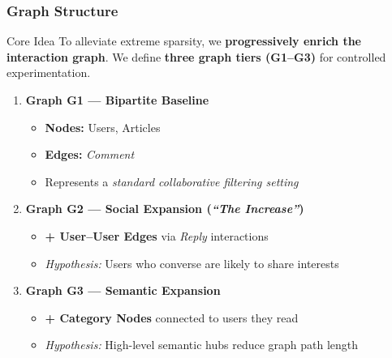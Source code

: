 \documentclass{beamer}
\begin{document}
\begin{frame}
    \frametitle {Graph Structure}

    \begin{block}{Core Idea}
        To alleviate extreme sparsity, we \textbf{progressively enrich the interaction graph}.
        We define \textbf{three graph tiers (G1–G3)} for controlled experimentation.
    \end{block}

    \vspace{0.3cm}

    \begin{enumerate}
        \setlength\itemsep{0.9em}

        \item \textbf{Graph G1 — Bipartite Baseline}
              \begin{itemize}
                  \item \textbf{Nodes:} Users, Articles
                  \item \textbf{Edges:} \textit{Comment}
                  \item Represents a \textit{standard collaborative filtering setting}
              \end{itemize}

        \item \textbf{Graph G2 — Social Expansion (\textit{``The Increase''})}
              \begin{itemize}
                  \item \textbf{+ User–User Edges} via \textit{Reply} interactions
                  \item \textit{Hypothesis:} Users who converse are likely to share interests
              \end{itemize}

        \item \textbf{Graph G3 — Semantic Expansion}
              \begin{itemize}
                  \item \textbf{+ Category Nodes} connected to users they read
                  \item \textit{Hypothesis:} High-level semantic hubs reduce graph path length
              \end{itemize}

    \end{enumerate}
\end{frame}
\end{document}
